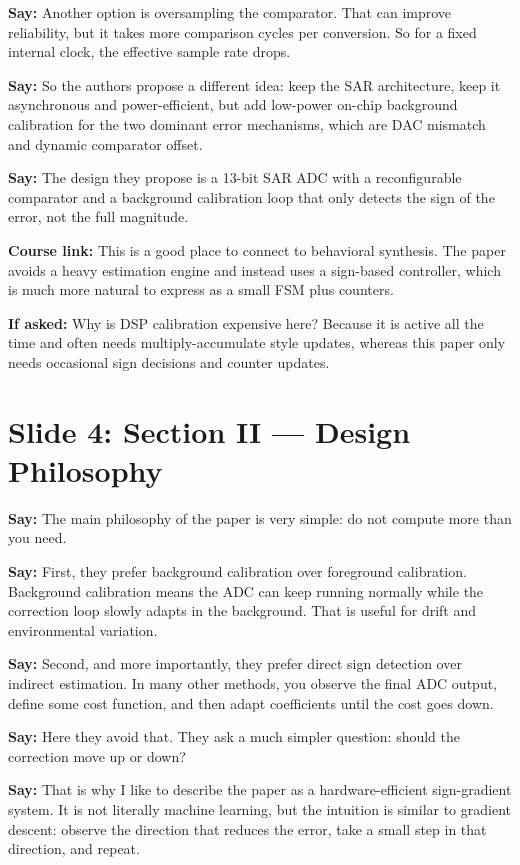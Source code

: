 \documentclass[11pt]{article}
\newcommand{\speak}[1]{\textbf{Say:} #1}
\newcommand{\ifasked}[1]{\textbf{If asked:} #1}
\newcommand{\course}[1]{\textbf{Course link:} #1}
\begin{document}
\speak{Another option is oversampling the comparator. That can improve reliability, but it takes more comparison cycles per conversion. So for a fixed internal clock, the effective sample rate drops.}

\speak{So the authors propose a different idea: keep the SAR architecture, keep it asynchronous and power-efficient, but add low-power on-chip background calibration for the two dominant error mechanisms, which are DAC mismatch and dynamic comparator offset.}

\speak{The design they propose is a 13-bit SAR ADC with a reconfigurable comparator and a background calibration loop that only detects the sign of the error, not the full magnitude.}

\course{This is a good place to connect to behavioral synthesis. The paper avoids a heavy estimation engine and instead uses a sign-based controller, which is much more natural to express as a small FSM plus counters.}

\ifasked{Why is DSP calibration expensive here? Because it is active all the time and often needs multiply-accumulate style updates, whereas this paper only needs occasional sign decisions and counter updates.}

\section*{Slide 4: Section II --- Design Philosophy}
\speak{The main philosophy of the paper is very simple: do not compute more than you need.}

\speak{First, they prefer background calibration over foreground calibration. Background calibration means the ADC can keep running normally while the correction loop slowly adapts in the background. That is useful for drift and environmental variation.}

\speak{Second, and more importantly, they prefer direct sign detection over indirect estimation. In many other methods, you observe the final ADC output, define some cost function, and then adapt coefficients until the cost goes down.}

\speak{Here they avoid that. They ask a much simpler question: should the correction move up or down?}

\speak{That is why I like to describe the paper as a hardware-efficient sign-gradient system. It is not literally machine learning, but the intuition is similar to gradient descent: observe the direction that reduces the error, take a small step in that direction, and repeat.}
\end{document}
